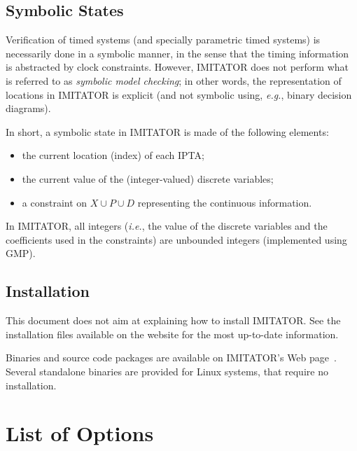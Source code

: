 \documentclass[a4paper,11pt]{report}
\makeatletter
\newcommand{\Clock}{X} %
\newcommand{\DVar}{D} %
\newcommand{\Param}{P} %
\newcommand{\imitator}{\textsf{IMITATOR}}
\newcommand{\IPTA}{IPTA}
\newcommand{\eg}{\textcolor{colorok}{\textit{e.g.},\@}}
\newcommand{\ie}{\textcolor{colorok}{\textit{i.e.},\@}}
\makeatother
\begin{document}
\section{Symbolic States}

Verification of timed systems (and specially parametric timed systems) is necessarily done in a symbolic manner, in the sense that the timing information is abstracted by clock constraints.
However, \imitator{} does not perform what is referred to as \emph{symbolic model checking}; in other words, the representation of locations in \imitator{} is explicit (and not symbolic using, \eg{} binary decision diagrams).

In short, a symbolic state in \imitator{} is made of the following elements:
\begin{itemize}
	\item the current location (index) of each \IPTA{};
	\item the current value of the (integer-valued) discrete variables;
	\item a constraint on $\Clock \cup \Param \cup \DVar$ representing the continuous information.
\end{itemize}
In \imitator{}, all integers (\ie{} the value of the discrete variables and the coefficients used in the constraints) are unbounded integers (implemented using GMP).



\section{Installation}

This document does not aim at explaining how to install \imitator{}.
See the installation files available on the website for the most up-to-date information.

Binaries and source code packages are available on \imitator{}'s Web page~\cite{imitator}.
Several standalone binaries are provided for Linux systems, that require no installation.



\chapter{List of Options}\label{chapter:options}
\end{document}
